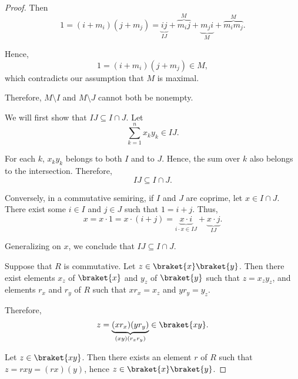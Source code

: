 \begin{proof}
  Then
  \begin{equation*}
    1 = (i + m_i) (j + m_j) = \underbrace{ij}_{IJ} + \overbrace{m_i j}^M + \underbrace{m_j i}_M + \overbrace{m_i m_j}^M.
  \end{equation*}

  Hence,
  \begin{equation*}
    1 = (i + m_i) (j + m_j) \in M,
  \end{equation*}
  which contradicts our assumption that \( M \) is maximal.

  Therefore, \( M \setminus I \) and \( M \setminus J \) cannot both be nonempty.

  \SufficiencySubProof* We will first show that \( IJ \subseteq I \cap J \). Let
  \begin{equation*}
    \sum_{k=1}^n x_k y_k \in IJ.
  \end{equation*}

  For each \( k \), \( x_k y_k \) belongs to both \( I \) and to \( J \). Hence, the sum over \( k \) also belongs to the intersection. Therefore,
  \begin{equation*}
    IJ \subseteq I \cap J.
  \end{equation*}

  \NecessitySubProof* Conversely, in a commutative semiring, if \( I \) and \( J \) are coprime, let \( x \in I \cap J \). There exist some \( i \in I \) and \( j \in J \) such that \( 1 = i + j \). Thus,
  \begin{equation*}
    x = x \cdot 1 = x \cdot (i + j) = \underbrace{x \cdot i}_{i \cdot x \in IJ} + \underbrace{x \cdot j}_{IJ}.
  \end{equation*}

  Generalizing on \( x \), we conclude that \( IJ \subseteq I \cap J \).

   Suppose that \( R \) is commutative.
  \SufficiencySubProof* Let \( z \in \braket{x} \braket{y} \). Then there exist elements \( x_z \) of \( \braket{x} \) and \( y_z \) of \( \braket{y} \) such that \( z = x_z y_z \), and elements \( r_x \) and \( r_y \) of \( R \) such that \( x r_x = x_z \) and \( y r_y = y_z \).

  Therefore,
  \begin{equation*}
    z = \underbrace{(x r_x) (y r_y)}_{(xy) (r_x r_y)} \in \braket{xy}.
  \end{equation*}

  \NecessitySubProof* Let \( z \in \braket{xy} \). Then there exists an element \( r \) of \( R \) such that \( z = rxy = (rx)(y) \), hence \( z \in \braket{x} \braket{y} \).


\end{proof}
